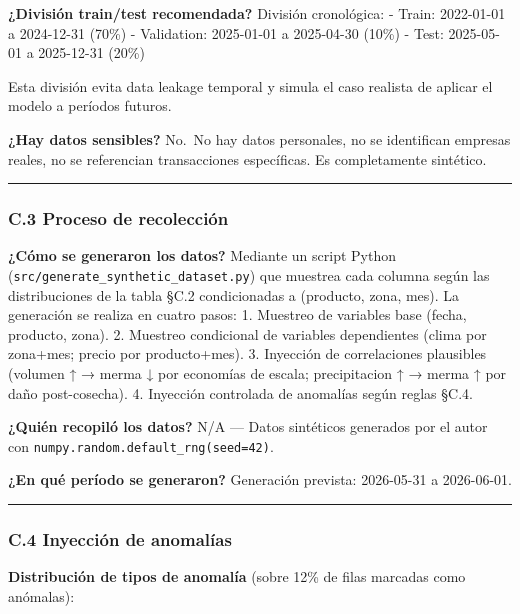 \textbf{¿División train/test recomendada?} División cronológica: -
Train: 2022-01-01 a 2024-12-31 (70\%) - Validation: 2025-01-01 a
2025-04-30 (10\%) - Test: 2025-05-01 a 2025-12-31 (20\%)

Esta división evita data leakage temporal y simula el caso realista de
aplicar el modelo a períodos futuros.

\textbf{¿Hay datos sensibles?} No.~No hay datos personales, no se
identifican empresas reales, no se referencian transacciones
específicas. Es completamente sintético.

\begin{center}\rule{0.5\linewidth}{0.5pt}\end{center}

\subsubsection{C.3 Proceso de
recolección}\label{c.3-proceso-de-recolecciuxf3n}

\textbf{¿Cómo se generaron los datos?} Mediante un script Python
(\texttt{src/generate\_synthetic\_dataset.py}) que muestrea cada columna
según las distribuciones de la tabla §C.2 condicionadas a (producto,
zona, mes). La generación se realiza en cuatro pasos: 1. Muestreo de
variables base (fecha, producto, zona). 2. Muestreo condicional de
variables dependientes (clima por zona+mes; precio por producto+mes). 3.
Inyección de correlaciones plausibles (volumen ↑ → merma ↓ por economías
de escala; precipitacion ↑ → merma ↑ por daño post-cosecha). 4.
Inyección controlada de anomalías según reglas §C.4.

\textbf{¿Quién recopiló los datos?} N/A --- Datos sintéticos generados
por el autor con \texttt{numpy.random.default\_rng(seed=42)}.

\textbf{¿En qué período se generaron?} Generación prevista: 2026-05-31 a
2026-06-01.

\begin{center}\rule{0.5\linewidth}{0.5pt}\end{center}

\subsubsection{C.4 Inyección de
anomalías}\label{c.4-inyecciuxf3n-de-anomaluxedas}

\textbf{Distribución de tipos de anomalía} (sobre 12\% de filas marcadas
como anómalas):

